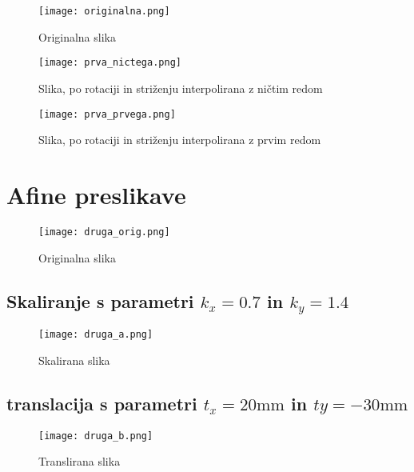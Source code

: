 \documentclass[12pt,a4paper]{article}
\begin{document}
\begin{figure}[h!]
  \begin{center}
    \texttt{[image: originalna.png]}
    \caption{Originalna slika}
    \label{fig:}
  \end{center}
\end{figure}
\pagebreak
\begin{figure}[h!]
  \begin{center}
    \texttt{[image: prva\_nictega.png]}
    \caption{Slika, po rotaciji in striženju interpolirana z ničtim redom}

  \end{center}
\end{figure}

\begin{figure}[h!]
  \begin{center}
    \texttt{[image: prva\_prvega.png]}
    \caption{Slika, po rotaciji in striženju interpolirana z prvim redom}

  \end{center}
\end{figure}
\pagebreak
\section{Afine preslikave}
\begin{figure}[h!]
  \begin{center}
    \texttt{[image: druga\_orig.png]}
    \caption{Originalna slika}

  \end{center}
\end{figure}
\subsection{Skaliranje s parametri $k_x = 0.7$ in $k_y = 1.4$}
\begin{figure}[h!]
  \begin{center}
    \texttt{[image: druga\_a.png]}
    \caption{Skalirana slika}
  
  \end{center}
\end{figure}
\pagebreak
\subsection{translacija s parametri $t_x = 20\text{mm}$ in $ty = -30\text{mm}$}
\begin{figure}[h!]
  \begin{center}
    \texttt{[image: druga\_b.png]}
    \caption{Translirana slika}
  \end{center}
\end{figure}
\end{document}
